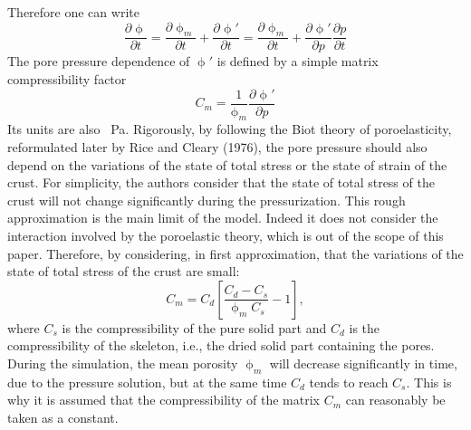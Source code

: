 Therefore one can write
\begin{equation}
\frac{\partial \upphi}{\partial t}
=\frac{\partial \upphi_m}{\partial t} +\frac{\partial \upphi'}{\partial t}
=\frac{\partial \upphi_m}{\partial t} +\frac{\partial \upphi'}{\partial p} \frac{\partial p}{\partial t}
\label{eq:por25}
\end{equation}
The pore pressure dependence of $\upphi'$ is defined by a
simple matrix compressibility factor
\begin{equation}
C_m = \frac{1}{\upphi_m}\frac{\partial \upphi'}{\partial p}
\label{eq:por24}
\end{equation}
Its units are also \si{\per\pascal}.
Rigorously, by following the Biot theory of poroelasticity,
reformulated later by Rice and Cleary (1976), the pore
pressure should also depend on the variations of the state of
total stress or the state of strain of the crust. For simplicity,
the authors consider that the state of total stress of the crust will
not change significantly during the pressurization. This
rough approximation is the main limit of the model. Indeed
it does not consider the interaction involved by the
poroelastic theory, which is out of the scope of this paper.
Therefore, by considering, in first approximation, that the
variations of the state of total stress of the crust are small:
\begin{equation}
C_m = C_d \left[ \frac{C_d - C_s}{\upphi_m C_s } - 1  \right],
\end{equation}
where $C_s$ is the compressibility of the pure solid part and $C_d$ is the
compressibility of the skeleton, i.e., the dried solid part
containing the pores. During the simulation, the mean
porosity $\upphi_m$ will decrease significantly in time, due to the
pressure solution, but at the same time $C_d$ tends to reach $C_s$.
This is why it is assumed that the compressibility of the
matrix $C_m$ can reasonably be taken as a constant. 

